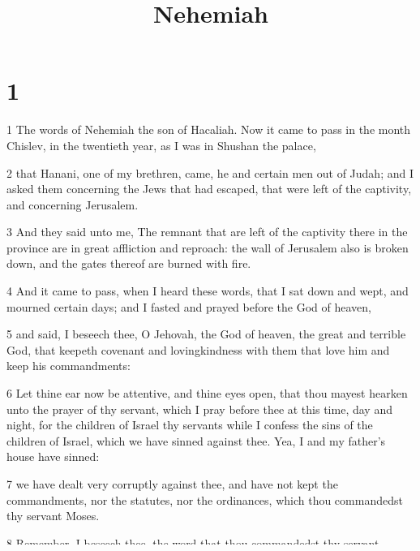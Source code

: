 

\title{Nehemiah}

\chapter{1}

\par 1 The words of Nehemiah the son of Hacaliah. Now it came to pass in the month Chislev, in the twentieth year, as I was in Shushan the palace,
\par 2 that Hanani, one of my brethren, came, he and certain men out of Judah; and I asked them concerning the Jews that had escaped, that were left of the captivity, and concerning Jerusalem.
\par 3 And they said unto me, The remnant that are left of the captivity there in the province are in great affliction and reproach: the wall of Jerusalem also is broken down, and the gates thereof are burned with fire.
\par 4 And it came to pass, when I heard these words, that I sat down and wept, and mourned certain days; and I fasted and prayed before the God of heaven,
\par 5 and said, I beseech thee, O Jehovah, the God of heaven, the great and terrible God, that keepeth covenant and lovingkindness with them that love him and keep his commandments:
\par 6 Let thine ear now be attentive, and thine eyes open, that thou mayest hearken unto the prayer of thy servant, which I pray before thee at this time, day and night, for the children of Israel thy servants while I confess the sins of the children of Israel, which we have sinned against thee. Yea, I and my father's house have sinned:
\par 7 we have dealt very corruptly against thee, and have not kept the commandments, nor the statutes, nor the ordinances, which thou commandedst thy servant Moses.
\par 8 Remember, I beseech thee, the word that thou commandedst thy servant Moses, saying, If ye trespass, I will scatter you abroad among the peoples:
\par 9 but if ye return unto me, and keep my commandments and do them, though your outcasts were in the uttermost part of the heavens, yet will I gather them from thence, and will bring them unto the place that I have chosen, to cause my name to dwell there.
\par 10 Now these are thy servants and thy people, whom thou hast redeemed by thy great power, and by thy strong hand.
\par 11 O Lord, I beseech thee, let now thine ear be attentive to the prayer of thy servant, and to the prayer of thy servants, who delight to fear thy name; and prosper, I pray thee, thy servant this day, and grant him mercy in the sight of this man. Now I was cupbearer to the king.

